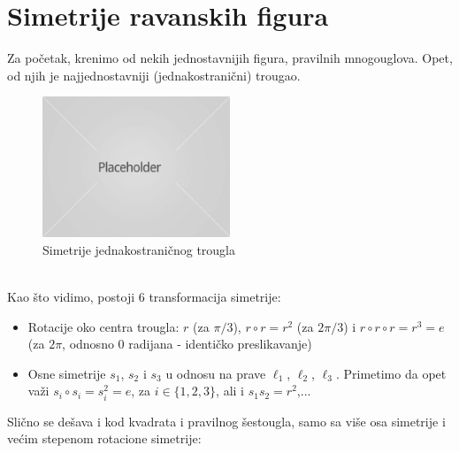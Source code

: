 \documentclass[times, utf8, diplomski]{fer}
\theoremstyle{plain}
\theoremstyle{definition}
\begin{document}
\section{Simetrije ravanskih figura}
Za po\v cetak, krenimo od nekih jednostavnijih figura, pravilnih mnogouglova. Opet, od njih je najjednostavniji (jednakostrani\v cni) trougao.\\
\begin{figure}[h]
\centering
\includegraphics[width=0.5\textwidth]{placeholder}
\caption{Simetrije jednakostrani\v cnog trougla}
\end{figure}\\
Kao \v sto vidimo, postoji 6 transformacija simetrije: \begin{itemize}
                                                         \item Rotacije oko centra trougla: $r$ (za $\pi/3$), $r\circ r = r^2$ (za $2\pi/3$) i $r\circ r \circ r = r^3 = e$ (za $2\pi$, odnosno $0$ radijana - identi\v cko preslikavanje)
                                                         \item Osne simetrije $s_1$, $s_2$ i $s_3$ u odnosu na prave $\ell_1$, $\ell_2$, $\ell_3$. Primetimo da opet va\v zi $s_i \circ s_i = s_i^2 = e$, za $i\in \lbrace 1, 2, 3 \rbrace$, ali i $s_1 s_2 = r^2$,...
                                                       \end{itemize}
Sli\v cno se de\v sava i kod kvadrata i pravilnog \v sestougla, samo sa vi\v se osa simetrije i ve\'cim stepenom rotacione simetrije:\\
\end{document}
